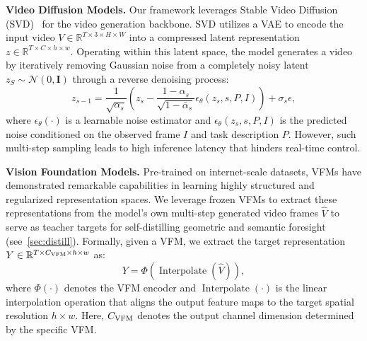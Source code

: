 
\label{sec:preliminaries}

\noindent \textbf{Video Diffusion Models.}
Our framework leverages Stable Video Diffusion (SVD)~\cite{blattmann2023stable} for the video generation backbone. SVD utilizes a VAE to encode the input video $V \in \mathbb{R}^{T \times 3 \times H \times W}$ into a compressed latent representation $z \in \mathbb{R}^{T \times C \times h \times w}$. Operating within this latent space, the model generates a video by iteratively removing Gaussian noise from a completely noisy latent $z_S \sim \mathcal{N}(0, \mathbf{I})$ through a reverse denoising process:
\begin{equation}
    z_{s-1} = \frac{1}{\sqrt{\alpha_s}} \left( z_s - \frac{1-\alpha_s}{\sqrt{1-\bar{\alpha}_s}} \epsilon_\theta(z_s, s, P,I) \right) + \sigma_s\epsilon,
\end{equation}
where $\epsilon_\theta(\cdot)$ is a learnable noise estimator and $\epsilon_\theta(z_s, s, P, I)$ is the predicted noise conditioned on the observed frame $I$ and task description $P$. However, such multi-step sampling leads to high inference latency that hinders real-time control.


\noindent \textbf{Vision Foundation Models.}
Pre-trained on internet-scale datasets, VFMs have demonstrated remarkable capabilities in learning highly structured and regularized representation spaces. We leverage frozen VFMs to extract these representations from the model's own multi-step generated video frames $\hat{V}$ to serve as teacher targets for self-distilling geometric and semantic foresight (see~\cref{sec:distill}). 
Formally, given a VFM, we extract the target representation $Y \in \mathbb{R}^{T\times C_\textnormal{VFM} \times h \times w}$ as:
\begin{equation}
    Y = \Phi(\operatorname{Interpolate}(\hat{V})),
\label{eq:vfm}
\end{equation}
where $\Phi(\cdot)$ denotes the VFM encoder and $\operatorname{Interpolate}(\cdot)$ is the linear interpolation operation that aligns the output feature maps to the target spatial resolution $h \times w$. Here, $C_\textnormal{VFM}$ denotes the output channel dimension determined by the specific VFM. 

